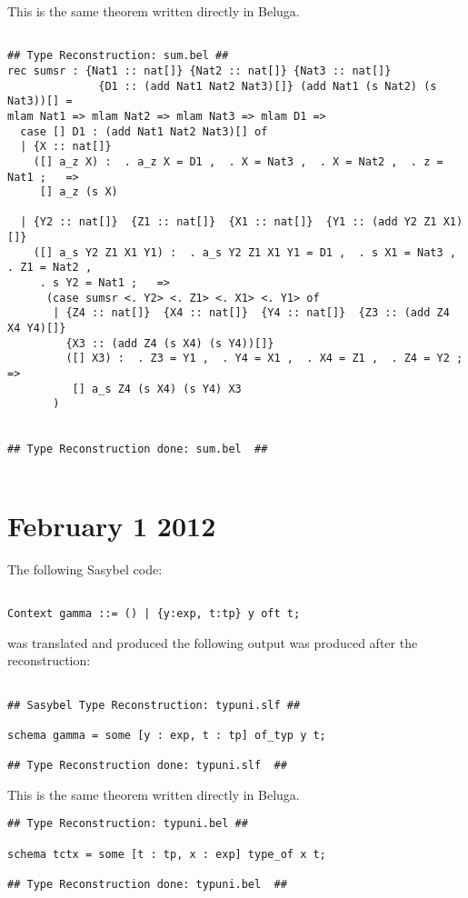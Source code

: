 \documentclass[12pt]{article}
\begin{document}
This is the same theorem written directly in \textmd{Beluga}.
\footnotesize\begin{verbatim}

## Type Reconstruction: sum.bel ##
rec sumsr : {Nat1 :: nat[]} {Nat2 :: nat[]} {Nat3 :: nat[]}
              {D1 :: (add Nat1 Nat2 Nat3)[]} (add Nat1 (s Nat2) (s Nat3))[] =
mlam Nat1 => mlam Nat2 => mlam Nat3 => mlam D1 =>
  case [] D1 : (add Nat1 Nat2 Nat3)[] of
  | {X :: nat[]}
    ([] a_z X) :  . a_z X = D1 ,  . X = Nat3 ,  . X = Nat2 ,  . z = Nat1 ;   =>
     [] a_z (s X)

  | {Y2 :: nat[]}  {Z1 :: nat[]}  {X1 :: nat[]}  {Y1 :: (add Y2 Z1 X1)[]}
    ([] a_s Y2 Z1 X1 Y1) :  . a_s Y2 Z1 X1 Y1 = D1 ,  . s X1 = Nat3 ,  . Z1 = Nat2 ,
     . s Y2 = Nat1 ;   =>
      (case sumsr <. Y2> <. Z1> <. X1> <. Y1> of
       | {Z4 :: nat[]}  {X4 :: nat[]}  {Y4 :: nat[]}  {Z3 :: (add Z4 X4 Y4)[]}
         {X3 :: (add Z4 (s X4) (s Y4))[]}
         ([] X3) :  . Z3 = Y1 ,  . Y4 = X1 ,  . X4 = Z1 ,  . Z4 = Y2 ;   =>
          [] a_s Z4 (s X4) (s Y4) X3
       )


## Type Reconstruction done: sum.bel  ##


\end{verbatim}

\section{February 1 2012}
The following \textmd{Sasybel} code:
\footnotesize\begin{verbatim}

Context gamma ::= () | {y:exp, t:tp} y oft t;

\end{verbatim}
was translated and produced the following output was produced after the reconstruction:
\footnotesize\begin{verbatim}

## Sasybel Type Reconstruction: typuni.slf ##

schema gamma = some [y : exp, t : tp] of_typ y t;

## Type Reconstruction done: typuni.slf  ##

\end{verbatim}
This is the same theorem written directly in \textmd{Beluga}.
\footnotesize\begin{verbatim}
## Type Reconstruction: typuni.bel ##

schema tctx = some [t : tp, x : exp] type_of x t;

## Type Reconstruction done: typuni.bel  ##

\end{verbatim}
\end{document}
